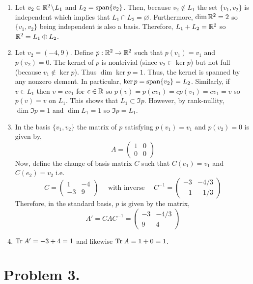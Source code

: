\documentclass[12pt]{extarticle}
\begin{document}
\begin{enumerate}
\item Let $v_2 \in \mathbb{R}^2 \! \setminus \! L_1$ and $L_2 = \mathrm{span}\! \left\{v_2 \right\}$. Then, because $v_2 \notin L_1$ the set $\{v_1, v_2\}$ is independent which implies that $L_1 \cap L_2 = \varnothing$. Furthermore, $\dim{\mathbb{R}^2} = 2$ so $\{v_1, v_2\}$ being independent is also a basis. Therefore, $L_1 + L_2 = \mathbb{R}^2$ so $\mathbb{R}^2 = L_1 \oplus L_2$. 

\item Let $v_2 = (-4, 9)$. Define $p : \mathbb{R}^2 \to \mathbb{R}^2$
such that $p(v_1) = v_1$ and $p(v_2) = 0$. The kernel of $p$ is nontrivial (since $v_2 \in \ker{p}$) but not full (because $v_1 \notin \ker{p}$). Thus $\dim{\ker{p}} = 1$. Thus, the kernel is spanned by any nonzero element. In particular, $\ker{p} = \mathrm{span}\! \left\{v_2 \right\} = L_2$. Similarly, if $v \in L_1$ then $v = c v_1$ for $c \in \mathbb{R}$ so $p(v) = p (cv_1) = c p(v_1) = cv_1 = v$ so $p(v) = v$ on $L_1$. This shows that $L_1 \subset \Im{p}$. However, by rank-nullity, $\dim{\Im{p}} = 1$ and $\dim{L_1} = 1$ so $\Im{p} = L_1$. 
\item 
In the basis $\{v_1, v_2\}$ the matrix of $p$ satisfying $p(v_1) = v_1$ and $p(v_2) = 0$ is given by,
\[ A = 
\begin{pmatrix}
1 & 0 \\
0 & 0 
\end{pmatrix} 
\]
Now, define the change of basis matrix $C$ such that $C(e_1) = v_1$ and $C(e_2) = v_2$ i.e.
\[ C = 
\begin{pmatrix}
1 & -4 \\
-3 & 9 
\end{pmatrix} 
\quad \text{ with inverse } \quad C^{-1} = 
\begin{pmatrix}
-3 & -4/3 \\
-1 & -1/3 
\end{pmatrix} 
\]
Therefore, in the standard basis, $p$ is given by the matrix,
\[ A' = C A C^{-1} = 
\begin{pmatrix}
-3 & -4/3 \\
9 & 4
\end{pmatrix} 
\]

\item $\mathrm{Tr} \: A' = -3 + 4 = 1$ and likewise $\mathrm{Tr} \: A = 1 + 0 = 1$.
\end{enumerate}

\section*{Problem 3.}
\end{document}
